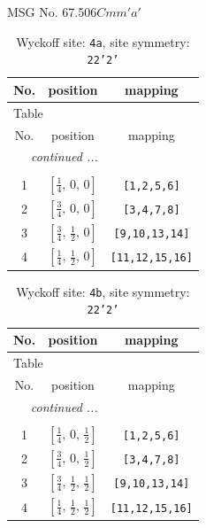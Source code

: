 \documentclass[fleqn,8pt]{jsarticle}
\begin{document}
\setcounter{MaxMatrixCols}{32}

\renewcommand{\tablename}{Table~}
\renewcommand{\figurename}{Figure~}
\begin{center}
\LARGE
MSG No. 67.506\quad$Cmm'a'$
\end{center}
\renewcommand{\arraystretch}{1.2}
\begin{longtable}{ccc}
\caption{Wyckoff site: {\tt 4a}, site symmetry: {\tt 22'2'}}
 \\
 \hline \hline
No. & position & mapping \\ \hline \endfirsthead

\multicolumn{2}{l}{\tablename\ \thetable{}} \\
 \hline \hline
No. & position & mapping \\ \hline \endhead

 \hline \hline
\multicolumn{2}{r}{\footnotesize\it continued ...} \\ \endfoot

 \hline \hline
\multicolumn{2}{r}{} \\ \endlastfoot

1 & $\left[ \frac{1}{4},\, 0,\, 0 \right]$ & {\tt [1,2,5,6]} \\ \hline
2 & $\left[ \frac{3}{4},\, 0,\, 0 \right]$ & {\tt [3,4,7,8]} \\ \hline
3 & $\left[ \frac{3}{4},\, \frac{1}{2},\, 0 \right]$ & {\tt [9,10,13,14]} \\ \hline
4 & $\left[ \frac{1}{4},\, \frac{1}{2},\, 0 \right]$ & {\tt [11,12,15,16]} \\
\end{longtable}
\renewcommand{\arraystretch}{1.2}
\begin{longtable}{ccc}
\caption{Wyckoff site: {\tt 4b}, site symmetry: {\tt 22'2'}}
 \\
 \hline \hline
No. & position & mapping \\ \hline \endfirsthead

\multicolumn{2}{l}{\tablename\ \thetable{}} \\
 \hline \hline
No. & position & mapping \\ \hline \endhead

 \hline \hline
\multicolumn{2}{r}{\footnotesize\it continued ...} \\ \endfoot

 \hline \hline
\multicolumn{2}{r}{} \\ \endlastfoot

1 & $\left[ \frac{1}{4},\, 0,\, \frac{1}{2} \right]$ & {\tt [1,2,5,6]} \\ \hline
2 & $\left[ \frac{3}{4},\, 0,\, \frac{1}{2} \right]$ & {\tt [3,4,7,8]} \\ \hline
3 & $\left[ \frac{3}{4},\, \frac{1}{2},\, \frac{1}{2} \right]$ & {\tt [9,10,13,14]} \\ \hline
4 & $\left[ \frac{1}{4},\, \frac{1}{2},\, \frac{1}{2} \right]$ & {\tt [11,12,15,16]} \\
\end{longtable}
\end{document}
